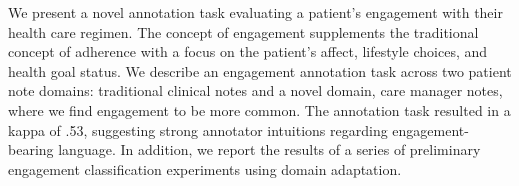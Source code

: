 We present a novel annotation task evaluating a patient's engagement with their health care regimen. The concept of engagement supplements the traditional concept of adherence with a focus on the patient's affect, lifestyle choices, and health goal status. We describe an engagement annotation task across two patient note domains: traditional clinical notes and a novel domain, care manager notes, where we find engagement to be more common. The annotation task resulted in a kappa of .53, suggesting strong annotator intuitions regarding engagement-bearing language.  In addition, we report the results of a series of preliminary engagement classification experiments using domain adaptation.
